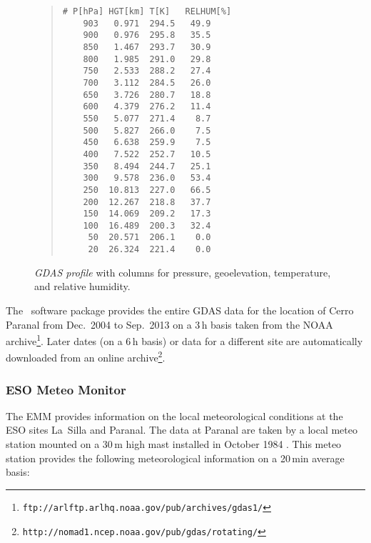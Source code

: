 \begin{figure}[ht]
  \begin{center}
    \begin{quote}
      \begin{small}
        \begin{verbatim}
# P[hPa] HGT[km] T[K]   RELHUM[%]
    903   0.971  294.5   49.9
    900   0.976  295.8   35.5
    850   1.467  293.7   30.9
    800   1.985  291.0   29.8
    750   2.533  288.2   27.4
    700   3.112  284.5   26.0
    650   3.726  280.7   18.8
    600   4.379  276.2   11.4
    550   5.077  271.4    8.7
    500   5.827  266.0    7.5
    450   6.638  259.9    7.5
    400   7.522  252.7   10.5
    350   8.494  244.7   25.1
    300   9.578  236.0   53.4
    250  10.813  227.0   66.5
    200  12.267  218.8   37.7
    150  14.069  209.2   17.3
    100  16.489  200.3   32.4
     50  20.571  206.1    0.0
     20  26.324  221.4    0.0
        \end{verbatim}
      \end{small}
    \end{quote}
    \caption{{\it GDAS profile} with columns for pressure, geoelevation,
    temperature, and relative humidity.}
    \label{fig:gdas}
  \end{center}
\end{figure}

The \mf\ software package provides the entire \ac{GDAS} data for the location
of Cerro Paranal from Dec.~2004 to Sep.~2013 on a 3\,h basis taken from the
\ac{NOAA}
archive\footnote{ \tt ftp://arlftp.arlhq.noaa.gov/pub/archives/gdas1/}.
Later dates (on a 6\,h basis) or data for a different site are automatically
downloaded from an online
archive\footnote{\tt http://nomad1.ncep.noaa.gov/pub/gdas/rotating/}.


\subsubsection{ESO Meteo Monitor}\label{sec:emm}
The \ac{EMM} provides information on the local meteorological conditions at the
ESO sites La~Silla and Paranal. The data at Paranal are taken by a local meteo
station mounted on a 30\,m high mast installed in October 1984
\cite{meteomonitor}. This meteo station provides the following meteorological
information on a 20\,min average basis:


